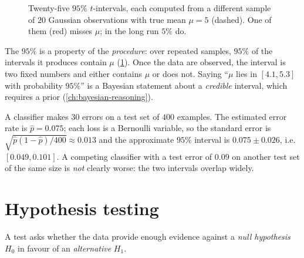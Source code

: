 \begin{notechapter}
\begin{figure}[ht]
\caption{Twenty-five $95\%$ $t$-intervals, each computed from a different sample
of $20$ Gaussian observations with true mean $\mu = 5$ (dashed). One of them
(red) misses $\mu$; in the long run $5\%$ do.}
\label{lln-clt-inference:fig:ci}
\end{figure}

\begin{pitfall}
The $95\%$ is a property of the \emph{procedure}: over repeated samples, $95\%$
of the intervals it produces contain $\mu$ (\cref{lln-clt-inference:fig:ci}).
Once the data are observed, the interval is two fixed numbers and either
contains $\mu$ or does not. Saying ``$\mu$ lies in $[4.1, 5.3]$ with probability
$95\%$'' is a Bayesian statement about a \emph{credible} interval, which requires
a prior (\cref{ch:bayesian-reasoning}).
\end{pitfall}

\begin{example}\label{lln-clt-inference:ex:error}
A classifier makes $30$ errors on a test set of $400$ examples. The estimated
error rate is $\hat p = 0.075$; each loss is a Bernoulli variable, so the
standard error is $\sqrt{\hat p(1-\hat p)/400}\approx0.013$ and the approximate
$95\%$ interval is $0.075\pm0.026$, i.e.\ $[0.049, 0.101]$. A competing
classifier with a test error of $0.09$ on another test set of the same size is
\emph{not} clearly worse: the two intervals overlap widely.
\end{example}

\section{Hypothesis testing}\label{lln-clt-inference:sec:tests}

A test asks whether the data provide enough evidence against a \emph{null
hypothesis} $H_0$ in favour of an \emph{alternative} $H_1$.


\end{notechapter}
